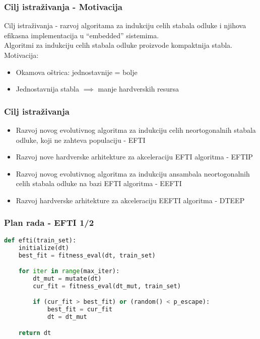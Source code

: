 \documentclass{beamer}
\begin{document}
\begin{frame}
\frametitle{Cilj istraživanja - Motivacija}

Cilj istraživanja - razvoj algoritama za indukciju celih stabala
odluke i njihova efikasna implementacija u “embedded” sistemima.\\
\vspace{1em}
Algoritmi za indukciju celih stabala odluke proizvode kompaktnija
stabla.\\
\vspace{1em}
Motivacija:\\
\vspace{1em}
\begin{itemize}
\item Okamova oštrica: jednostavnije = bolje
\item Jednostavnija stabla $\implies$ manje hardverskih resursa
\end{itemize}
\end{frame}


\begin{frame}
\frametitle{Cilj istraživanja}
\begin{itemize}
\setlength{\itemsep}{\fill}
\item Razvoj novog evolutivnog algoritma za indukciju celih neortogonalnih stabala
odluke, koji ne zahteva populaciju - EFTI
\item Razvoj nove hardverske arhitekture za akceleraciju EFTI
  algoritma - EFTIP
\item Razvoj novog evolutivnog algoritma za indukciju ansambala neortogonalnih celih
stabala odluke na bazi EFTI algoritma - EEFTI
\item Razvoj hardverske arhitekture za akceleraciju EEFTI algoritma - DTEEP
\end{itemize}
\end{frame}


\begin{frame}[fragile]
\frametitle{Plan rada - EFTI 1/2}
\small\begin{lstlisting}[language=Python]
def efti(train_set):
    initialize(dt)
    best_fit = fitness_eval(dt, train_set)

    for iter in range(max_iter):
        dt_mut = mutate(dt)
        cur_fit = fitness_eval(dt_mut, train_set)

        if (cur_fit > best_fit) or (random() < p_escape):
            best_fit = cur_fit
            dt = dt_mut

    return dt
\end{lstlisting}
\end{frame}
\end{document}
